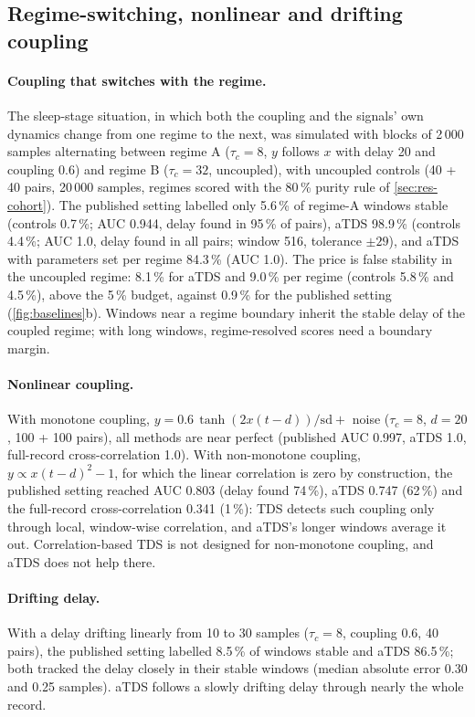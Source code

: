 \documentclass[11pt,a4paper]{article}
\begin{document}
\subsection{Regime-switching, nonlinear and drifting coupling}
\label{sec:res-hard}
\paragraph{Coupling that switches with the regime.} The sleep-stage situation, in which both the coupling and the signals' own dynamics change from one regime to the next, was simulated with blocks of 2\,000 samples alternating between regime A ($\tau_c = 8$, $y$ follows $x$ with delay 20 and coupling 0.6) and regime B ($\tau_c = 32$, uncoupled), with uncoupled controls (40 + 40 pairs, 20\,000 samples, regimes scored with the 80\,\% purity rule of \cref{sec:res-cohort}). The published setting labelled only 5.6\,\% of regime-A windows stable (controls 0.7\,\%; AUC 0.944, delay found in 95\,\% of pairs), aTDS 98.9\,\% (controls 4.4\,\%; AUC 1.0, delay found in all pairs; window 516, tolerance $\pm29$), and aTDS with parameters set per regime 84.3\,\% (AUC 1.0). The price is false stability in the uncoupled regime: 8.1\,\% for aTDS and 9.0\,\% per regime (controls 5.8\,\% and 4.5\,\%), above the 5\,\% budget, against 0.9\,\% for the published setting (\cref{fig:baselines}b). Windows near a regime boundary inherit the stable delay of the coupled regime; with long windows, regime-resolved scores need a boundary margin.

\paragraph{Nonlinear coupling.} With monotone coupling, $y = 0.6\,\tanh(2x(t-d))/\mathrm{sd} + $ noise ($\tau_c = 8$, $d = 20$, 100 + 100 pairs), all methods are near perfect (published AUC 0.997, aTDS 1.0, full-record cross-correlation 1.0). With non-monotone coupling, $y \propto x(t-d)^2 - 1$, for which the linear correlation is zero by construction, the published setting reached AUC 0.803 (delay found 74\,\%), aTDS 0.747 (62\,\%) and the full-record cross-correlation 0.341 (1\,\%): TDS detects such coupling only through local, window-wise correlation, and aTDS's longer windows average it out. Correlation-based TDS is not designed for non-monotone coupling, and aTDS does not help there.

\paragraph{Drifting delay.} With a delay drifting linearly from 10 to 30 samples ($\tau_c = 8$, coupling 0.6, 40 pairs), the published setting labelled 8.5\,\% of windows stable and aTDS 86.5\,\%; both tracked the delay closely in their stable windows (median absolute error 0.30 and 0.25 samples). aTDS follows a slowly drifting delay through nearly the whole record.
\end{document}
